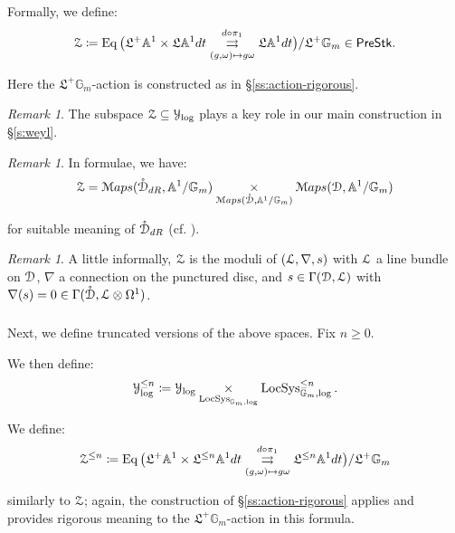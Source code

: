 \documentclass[reqno,11pt]{amsart}
\numberwithin{equation}{subsection}
\theoremstyle{remark}
\newtheorem{rem}[thm]{Remark}
\newcommand{\bA}{{\mathbb A}}
\newcommand{\bG}{{\mathbb G}}
\newcommand{\sD}{{\EuScript D}}
\newcommand{\sL}{{\EuScript L}}
\newcommand{\sM}{{\EuScript M}}
\newcommand{\sY}{{\EuScript Y}}
\newcommand{\sZ}{{\EuScript Z}}
\newcommand{\fL}{{\mathfrak L}}
\newcommand{\on}{\operatorname}
\newcommand{\LocSys}{\on{LocSys}}
\newcommand{\PreStk}{\mathsf{PreStk}}
\newcommand{\Maps}{\sM aps}
\renewcommand{\o}[1]{\mathring{#1}}
\renewcommand{\subset}{\subseteq}
\begin{document}
Formally, we define: 
%
\[
\sZ \coloneqq \on{Eq}
\big(\fL^+ \bA^1 \times \fL \bA^1 dt 
\underset{(g,\omega) \mapsto g\omega}{\overset{d\circ \pi_1}{\rightrightarrows}}
\fL \bA^1 dt\big)/\fL^+ \bG_m \in \PreStk.
\]

\noindent Here the $\fL^+ \bG_m$-action is constructed as in
\S \ref{ss:action-rigorous}.

\begin{rem}

The subspace $\sZ \subset \sY_{\log}$ plays a key role in our
main construction in \S \ref{s:weyl}.

\end{rem}

\begin{rem}

In formulae, we have:
%
\[
\sZ = \Maps(\o{\sD}_{dR},\bA^1/\bG_m) 
\underset{\Maps(\o{\sD},\bA^1/\bG_m)}{\times}
\Maps(\sD,\bA^1/\bG_m)
\] 

\noindent for suitable meaning of $\o{\sD}_{dR}$
(cf. \cite{}).

\end{rem}

\begin{rem}

A little informally, $\sZ$ is the moduli of $(\sL,\nabla,s)$ with $\sL$ 
a line bundle on $\sD$, $\nabla$ a connection on the punctured disc,
and $s \in \Gamma(\sD,\sL)$ with $\nabla(s) = 0 \in 
\Gamma(\o{\sD},\sL \otimes \Omega^1)$.

\end{rem}


\subsubsection{} 

Next, we define truncated versions of the above spaces. 
Fix $n \geq 0$.
 
We then define:
%
\[
\sY_{\log}^{\leq n} \coloneqq \sY_{\log} 
\underset{\LocSys_{\bG_m,\log}}{\times} 
\LocSys_{\bG_m,\log}^{\leq n}.
\]

We define:
%
\[
\sZ^{\leq n} \coloneqq \on{Eq}
\big(\fL^+ \bA^1 \times \fL^{\leq n} \bA^1 dt 
\underset{(g,\omega) \mapsto g\omega}{\overset{d\circ \pi_1}{\rightrightarrows}}
\fL^{\leq n} \bA^1 dt\big)/\fL^+ \bG_m 
\]

\noindent similarly to $\sZ$; again, the construction
of \S \ref{ss:action-rigorous} applies and provides rigorous
meaning to the $\fL^+ \bG_m$-action in this formula.
\end{document}
